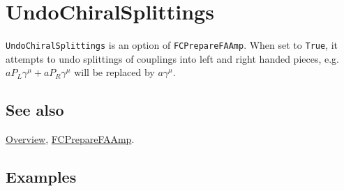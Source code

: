 \documentclass[../FeynCalcManual.tex]{subfiles}
\begin{document}
\hypertarget{undochiralsplittings}{
\section{UndoChiralSplittings}\label{undochiralsplittings}}

\texttt{UndoChiralSplittings} is an option of \texttt{FCPrepareFAAmp}.
When set to \texttt{True}, it attempts to undo splittings of couplings
into left and right handed pieces,
e.g.~\(a P_L \gamma^\mu + a P_R \gamma^\mu\) will be replaced by
\(a \gamma^\mu\).

\subsection{See also}

\hyperlink{toc}{Overview}, \hyperlink{fcpreparefaamp}{FCPrepareFAAmp}.

\subsection{Examples}
\end{document}
